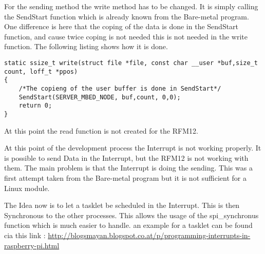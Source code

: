 For the sending method the write method has to be changed. It is simply calling the SendStart function which is already known from the Bare-metal program. One difference is here that the coping of the data is done in the SendStart function, and cause twice coping is not needed this is not needed in the write function. The following listing shows how it is done. 

\begin{lstlisting}
static ssize_t write(struct file *file, const char __user *buf,size_t count, loff_t *ppos)
{
	/*The copieng of the user buffer is done in SendStart*/
	SendStart(SERVER_MBED_NODE, buf,count, 0,0);
	return 0;
}
\end{lstlisting}

At this point the read function is not created for the RFM12. \newline

At this point of the development process the Interrupt is not working properly. It is possible to send Data in the Interrupt, but the RFM12 is not working with them. The main problem is that the Interrupt is doing the sending. This was a first attempt taken from the Bare-metal program but it is not sufficient for a Linux module. \newline

The Idea now is to let a tasklet be scheduled in the Interrupt. This is then Synchronous to the other processes. This allows the usage of the spi\_synchronus function which is much easier to handle. an example for a tasklet can be found cia this link : \url{http://blogsmayan.blogspot.co.at/p/programming-interrupts-in-raspberry-pi.html}
